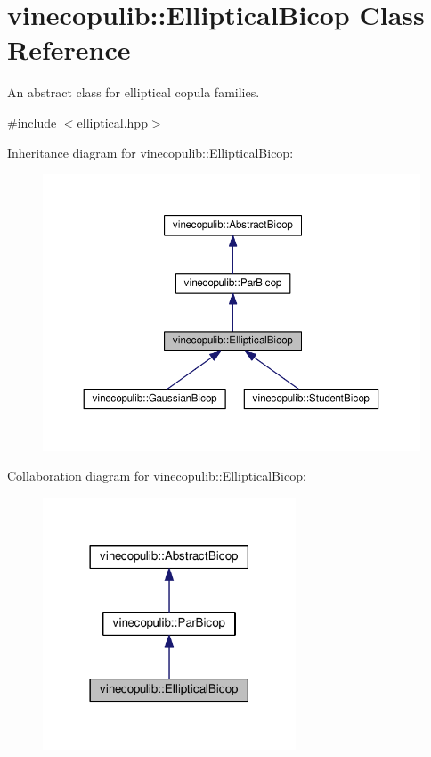 \hypertarget{classvinecopulib_1_1_elliptical_bicop}{}\section{vinecopulib\+:\+:Elliptical\+Bicop Class Reference}
\label{classvinecopulib_1_1_elliptical_bicop}


An abstract class for elliptical copula families.  




{\ttfamily \#include $<$elliptical.\+hpp$>$}



Inheritance diagram for vinecopulib\+:\+:Elliptical\+Bicop\+:
\nopagebreak
\begin{figure}[H]
\begin{center}
\leavevmode
\includegraphics[width=350pt]{classvinecopulib_1_1_elliptical_bicop__inherit__graph}
\end{center}
\end{figure}


Collaboration diagram for vinecopulib\+:\+:Elliptical\+Bicop\+:
\nopagebreak
\begin{figure}[H]
\begin{center}
\leavevmode
\includegraphics[width=213pt]{classvinecopulib_1_1_elliptical_bicop__coll__graph}
\end{center}
\end{figure}
